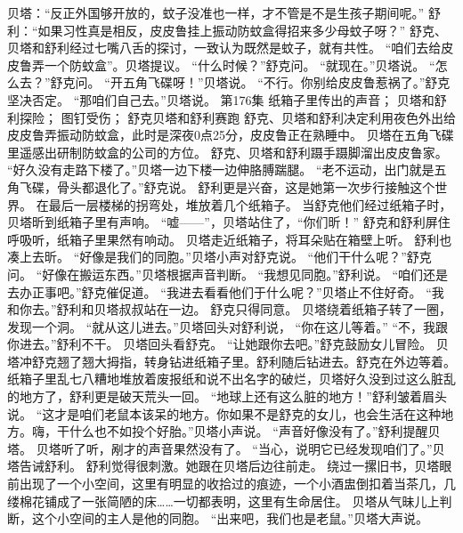 \documentclass[a4paper,12pt,UTF8,twoside]{ctexbook}
\begin{document}
        贝塔：“反正外国够开放的，蚊子没准也一样，才不管是不是生孩子期间呢。” 
        舒利：“如果习性真是相反，皮皮鲁挂上振动防蚊盒得招来多少母蚊子呀？” 
        舒克、贝塔和舒利经过七嘴八舌的探讨，一致认为既然是蚊子，就有共性。 
        “咱们去给皮皮鲁弄一个防蚊盒”。贝塔提议。 
        “什么时候？”舒克问。 
        “就现在。”贝塔说。 
        “怎么去？”舒克问。 
        “开五角飞碟呀！”贝塔说。 
        “不行。你别给皮皮鲁惹祸了。”舒克坚决否定。 
        “那咱们自己去。”贝塔说。   第176集 
        纸箱子里传出的声音； 
        贝塔和舒利探险； 
        图钉受伤； 
        舒克贝塔和舒利赛跑   
        舒克、贝塔和舒利决定利用夜色外出给皮皮鲁弄振动防蚊盒，此时是深夜0点25分，皮皮鲁正在熟睡中。 
        贝塔在五角飞碟里遥感出研制防蚊盒的公司的方位。 
        舒克、贝塔和舒利蹑手蹑脚溜出皮皮鲁家。 
        “好久没有走路下楼了。”贝塔一边下楼一边伸胳膊踹腿。 
        “老不运动，出门就是五角飞碟，骨头都退化了。”舒克说。 
        舒利更是兴奋，这是她第一次步行接触这个世界。 
        在最后一层楼梯的拐弯处，堆放着几个纸箱子。 
        当舒克他们经过纸箱子时，贝塔昕到纸箱子里有声响。 
        “嘘——”，贝塔站住了，“你们昕！” 
        舒克和舒利屏住呼吸听，纸箱子里果然有响动。 
        贝塔走近纸箱子，将耳朵贴在箱壁上听。 
        舒利也凑上去昕。 
        “好像是我们的同胞。”贝塔小声对舒克说。 
        “他们干什么呢？”舒克问。 
        “好像在搬运东西。”贝塔根据声音判断。 
        “我想见同胞。”舒利说。 
        “咱们还是去办正事吧。”舒克催促道。 
        “我进去看看他们于什么呢？”贝塔止不住好奇。 
        “我和你去。”舒利和贝塔叔叔站在一边。 
        舒克只得同意。 
        贝塔绕着纸箱子转了一圈，发现一个洞。 
        “就从这儿进去。”贝塔回头对舒利说，  “你在这儿等着。” 
        “不，我跟你进去。”舒利不干。 
        贝塔回头看舒克。 
        “让她跟你去吧。”舒克鼓励女儿冒险。 
        贝塔冲舒克翘了翘大拇指，转身钻进纸箱子里。舒利随后钻进去。舒克在外边等着。 
        纸箱子里乱七八糟地堆放着废报纸和说不出名字的破烂，贝塔好久没到过这么脏乱的地方了，舒利更是破天荒头一回。 
        “地球上还有这么脏的地方！”舒利皱着眉头说。 
        “这才是咱们老鼠本该呆的地方。你如果不是舒克的女儿，也会生活在这种地方。嗨，干什么也不如投个好胎。”贝塔小声说。 
        “声音好像没有了。”舒利提醒贝塔。 
        贝塔听了听，剐才的声音果然没有了。 
        “当心，说明它已经发现咱们了。”贝塔告诫舒利。 
        舒利觉得很刺激。她跟在贝塔后边往前走。 
        绕过一摞旧书，贝塔眼前出现了一个小空间，这里有明显的收拾过的痕迹，一个小酒盅倒扣着当茶几，几缕棉花铺成了一张简陋的床……一切都表明，这里有生命居住。 
        贝塔从气昧儿上判断，这个小空间的主人是他的同胞。 
        “出来吧，我们也是老鼠。”贝塔大声说。 
\end{document}
